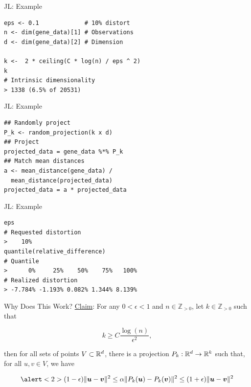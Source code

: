 \documentclass[14pt]{beamer}
\begin{document}
\begin{frame}[fragile]{JL: Example}
  \begin{lstlisting}
eps <- 0.1             # 10% distort
n <- dim(gene_data)[1] # Observations
d <- dim(gene_data)[2] # Dimension

k <-  2 * ceiling(C * log(n) / eps ^ 2)
k
# Intrinsic dimensionality
> 1338 (6.5% of 20531)
  \end{lstlisting}
\end{frame}

\begin{frame}[fragile]{JL: Example}
  \begin{lstlisting}
## Randomly project
P_k <- random_projection(k x d)
## Project
projected_data = gene_data %*% P_k
## Match mean distances
a <- mean_distance(gene_data) /
  mean_distance(projected_data)
projected_data = a * projected_data
  \end{lstlisting}
\end{frame}

\begin{frame}[fragile]{JL: Example}
  \begin{lstlisting}
eps
# Requested distortion
>    10%
quantile(relative_difference)
# Quantile
>      0%     25%    50%    75%   100%
# Realized distortion
> -7.784% -1.193% 0.082% 1.344% 8.139%
  \end{lstlisting}
\end{frame}

\begin{frame}{Why Does This Work?}
  \underline{Claim}: For any $0<\epsilon<1$ and $n\in\mathbb{Z}_{>0}$, let
  $k\in\mathbb{Z}_{>0}$ such that

  \begin{equation*}
    k \geq C \frac{\log(n)}{\epsilon^2},
  \end{equation*}

  \noindent then for all sets of points $V\subset\mathbb{R}^{d}$, there is a projection
  $P_k:\mathbb{R}^{d}\to\mathbb{R}^{k}$ such that, for all $u,v\in V$, we have

    \begin{equation*}
      \alert<2>{(1 - \epsilon)\|\vu - \vv\|^2 \leq \alpha\|P_k(\vu) - P_k(\vv)\|^2 \leq %
      (1 + \epsilon)\|\vu - \vv\|^2
}    \end{equation*}
\end{frame}
\end{document}
